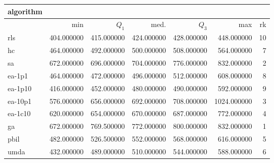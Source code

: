 \begin{tabular}{@{}l*{5}{>{{}}N{4}{0}}>{{}}N{2}{0}@{}}
\toprule
{algorithm} &  \\
\midrule
& {min} & {$Q_1$} & {med.} & {$Q_3$} & {max} & {rk}\\
\midrule
rls & 404.000000 & 415.000000 & 424.000000 & 428.000000 & 448.000000 & 10\\
hc & 464.000000 & 492.000000 & 500.000000 & 508.000000 & 564.000000 & 7\\
sa & {\color{blue}} 672.000000 & 696.000000 & 704.000000 & 776.000000 & 832.000000 & 2\\
ea-1p1 & 464.000000 & 472.000000 & 496.000000 & 512.000000 & 608.000000 & 8\\
ea-1p10 & 416.000000 & 452.000000 & 480.000000 & 490.000000 & 592.000000 & 9\\
ea-10p1 & 576.000000 & 656.000000 & 692.000000 & 708.000000 & {\color{blue}} 1024.000000 & 3\\
ea-1c10 & 620.000000 & 654.000000 & 670.000000 & 687.000000 & 772.000000 & 4\\
ga & {\color{blue}} 672.000000 & {\color{blue}} 769.500000 & {\color{blue}} 772.000000 & {\color{blue}} 800.000000 & 832.000000 & 1\\
pbil & 482.000000 & 526.500000 & 552.000000 & 568.000000 & 616.000000 & 5\\
umda & 432.000000 & 489.000000 & 510.000000 & 544.000000 & 588.000000 & 6\\
\bottomrule
\end{tabular}
